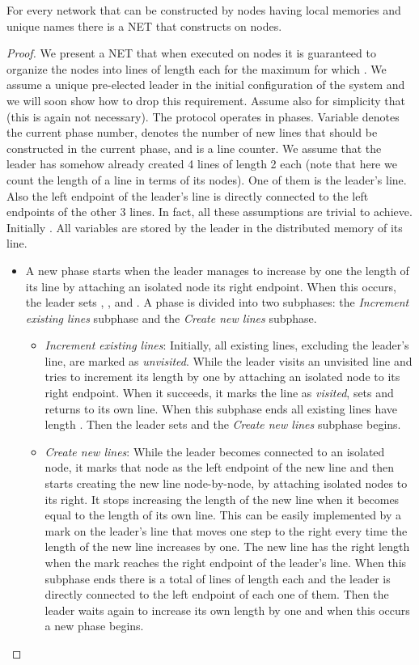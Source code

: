 \documentclass[oribibl, 11pt]{llncs}
\begin{document}
\begin{theorem}  \label{the:supernodes}
For every network  that can be constructed by  nodes having local memories  and unique names there is a NET that constructs  on  nodes.  
\end{theorem}
\begin{proof}
We present a NET  that when executed on  nodes it is guaranteed to organize the nodes into  lines of length  each for the maximum  for which . We assume a unique pre-elected leader in the initial configuration of the system and we will soon show how to drop this requirement. Assume also for simplicity that  (this is again not necessary). The protocol operates in phases. Variable  denotes the current phase number,  denotes the number of new lines that should be constructed in the current phase, and  is a line counter. We assume that the leader has somehow already created 4 lines of length 2 each (note that here we count the length of a line in terms of its nodes). One of them is the leader's line. Also the left endpoint of the leader's line is directly connected  to the left endpoints of the other 3 lines. In fact, all these assumptions are trivial to achieve. Initially . All variables are stored by the leader in the distributed memory of its line.
\begin{itemize}
 \item A new phase starts when the leader manages to increase by one the length of its line by attaching an isolated node its right endpoint. When this occurs, the leader sets , , and . A phase is divided into two subphases: the \emph{Increment existing lines} subphase and the \emph{Create new lines} subphase.
  \begin{itemize}
  \item \emph{Increment existing lines}: Initially, all existing lines, excluding the leader's line, are marked as \emph{unvisited}. While  the leader visits an unvisited line and tries to increment its length by one by attaching an isolated node to its right endpoint. When it succeeds, it marks the line as \emph{visited}, sets  and returns to its own line. When this subphase ends all existing lines have length . Then the leader sets  and the \emph{Create new lines} subphase begins.
  \item \emph{Create new lines}: While  the leader becomes connected to an isolated node, it marks that node as the left endpoint of the new line and then starts creating the new line node-by-node, by attaching isolated nodes to its right. It stops increasing the length of the new line when it becomes equal to the length of its own line. This can be easily implemented by a mark on the leader's line that moves one step to the right every time the length of the new line increases by one. The new line has the right length when the mark reaches the right endpoint of the leader's line. When this subphase ends there is a total of  lines of length  each and the leader is directly connected to the left endpoint of each one of them. Then the leader waits again to increase its own length by one and when this occurs a new phase begins. 
  \end{itemize}
\end{itemize}


\end{proof}
\end{document}
